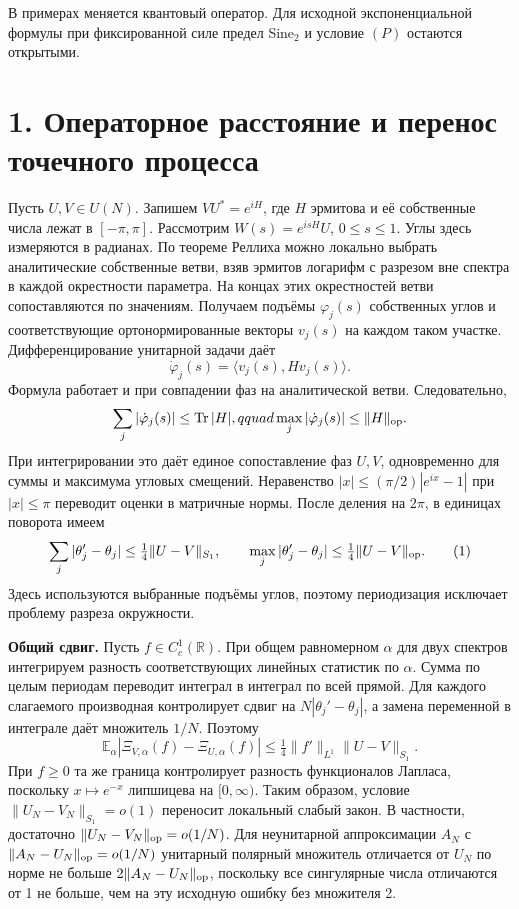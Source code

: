 \documentclass[11pt,a4paper]{article}
\newcommand{\Tr}{\operatorname{Tr}}
\newcommand{\EE}{\mathbb E}
\newcommand{\R}{\mathbb R}
\newcommand{\sect}[1]{\section*{\sffamily\color{ink}#1}}
\newcommand{\subt}[1]{\par\medskip\noindent\textbf{#1.}\quad}
\begin{document}
В примерах меняется квантовый оператор. Для исходной экспоненциальной формулы при фиксированной силе предел Sine\(_2\) и условие \((P)\) остаются открытыми.

\newpage
\sect{1. Операторное расстояние и перенос точечного процесса}
Пусть \(U,V\in U(N)\). Запишем \(VU^*=e^{iH}\), где \(H\) эрмитова и её собственные числа лежат в \([-\pi,\pi]\). Рассмотрим \(W(s)=e^{isH}U\), \(0\le s\le1\). Углы здесь измеряются в радианах. По теореме Реллиха можно локально выбрать аналитические собственные ветви, взяв эрмитов логарифм с разрезом вне спектра в каждой окрестности параметра. На концах этих окрестностей ветви сопоставляются по значениям. Получаем подъёмы \(\varphi_j(s)\) собственных углов и соответствующие ортонормированные векторы \(v_j(s)\) на каждом таком участке. Дифференцирование унитарной задачи даёт
\[
      \dot\varphi_j(s)=\langle v_j(s),H v_j(s)\rangle .
\]
Формула работает и при совпадении фаз на аналитической ветви. Следовательно,
\[
 \sum_j|\dot\varphi_j(s)|\le\Tr|H|,qquad
 \max_j|\dot\varphi_j(s)|\le\|H\|_{\rm op}.
\]
При интегрировании это даёт единое сопоставление фаз \(U,V\), одновременно для суммы и максимума угловых смещений. Неравенство \(|x|\le(\pi/2)|e^{ix}-1|\) при \(|x|\le\pi\) переводит оценки в матричные нормы. После деления на \(2\pi\), в единицах поворота имеем
\begin{equation}
  \sum_j|\theta_j'-\theta_j|\le\tfrac14\|U-V\|_{S_1},
  \qquad
  \max_j|\theta_j'-\theta_j|\le\tfrac14\|U-V\|_{\rm op} .
                                                        \tag{1}
\end{equation}
Здесь используются выбранные подъёмы углов, поэтому периодизация исключает проблему разреза окружности.

\subt{Общий сдвиг}
Пусть \(f\in C_c^1(\R)\). При общем равномерном \(\alpha\) для двух спектров интегрируем разность соответствующих линейных статистик по \(\alpha\). Сумма по целым периодам переводит интеграл в интеграл по всей прямой. Для каждого слагаемого производная контролирует сдвиг на \(N|\theta_j'-\theta_j|\), а замена переменной в интеграле даёт множитель \(1/N\). Поэтому
\begin{equation}
 \EE_\alpha|\Xi_{V,\alpha}(f)-\Xi_{U,\alpha}(f)|
       \le \tfrac14\|f'\|_{L^1}\|U-V\|_{S_1}.            \tag{2}
\end{equation}
При \(f\ge0\) та же граница контролирует разность функционалов Лапласа, поскольку \(x\mapsto e^{-x}\) липшицева на \([0,\infty)\). Таким образом, условие \(\|U_N-V_N\|_{S_1}=o(1)\) переносит локальный слабый закон. В частности, достаточно \(\|U_N-V_N\|_{\rm op}=o(1/N)\). Для неунитарной аппроксимации \(A_N\) с \(\|A_N-U_N\|_{\rm op}=o(1/N)\) унитарный полярный множитель отличается от \(U_N\) по норме не больше \(2\|A_N-U_N\|_{\rm op}\), поскольку все сингулярные числа отличаются от 1 не больше, чем на эту исходную ошибку без множителя 2.
\end{document}
